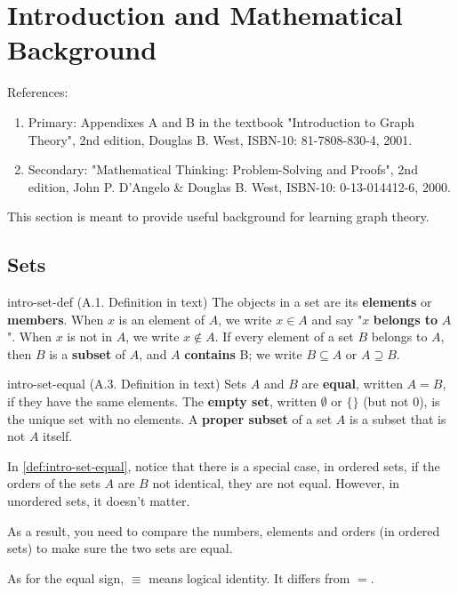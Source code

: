 \documentclass[../src/handouts/main.tex]{subfiles}
\begin{document}
\section{Introduction and Mathematical Background}

References:
\begin{enumerate}
  \item Primary: Appendixes A and B in the textbook "Introduction to Graph Theory", 2nd edition, Douglas B. West, ISBN-10: 81-7808-830-4, 2001.
  \item Secondary: "Mathematical Thinking: Problem-Solving and Proofs", 2nd edition, John P. D'Angelo \& Douglas B. West, ISBN-10: 0-13-014412-6, 2000.
\end{enumerate}

This section is meant to provide useful background for learning graph theory.

\subsection{Sets}

\begin{definition}{}{intro-set-def}
  (A.1. Definition in text)
  The objects in a set are its \textbf{elements} or \textbf{members}.
  When $x$ is an element of $A$, we write $x \in A$ and say "$x$ \textbf{belongs to} $A$".
  When $x$ is not in $A$, we write $x \notin A$.
  If every element of a set $B$ belongs to $A$, then $B$ is a \textbf{subset} of $A$, and $A$ \textbf{contains} B; we write $B \subseteq A$ or $A \supseteq B$.
\end{definition}

\begin{definition}{}{intro-set-equal}
  (A.3. Definition in text)
  Sets $A$ and $B$ are \textbf{equal}, written $A = B$, if they have the same elements. The \textbf{empty set}, written $\emptyset$ or $\lbrace \rbrace$ (but not 0), is the unique set with no elements. A \textbf{proper subset} of a set $A$ is a subset that is not $A$ itself.
\end{definition}

In \cref{def:intro-set-equal}, notice that there is a special case, in ordered sets, if the orders of the sets $A$ are $B$ not identical, they are not equal. However, in unordered sets, it doesn't matter.

As a result, you need to compare the numbers, elements and orders (in ordered sets) to make sure the two sets are equal.

As for the equal sign, $\equiv$ means logical identity. It differs from $=$.
\end{document}
